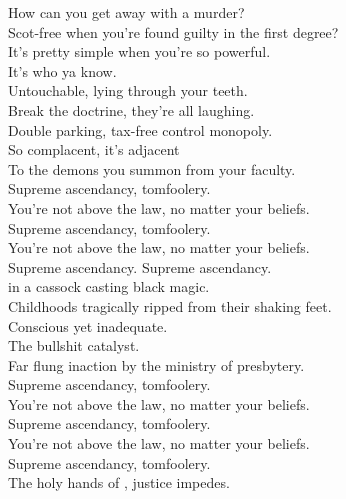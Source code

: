 



How can you get away with a murder? \\
Scot-free when you're found guilty in the first degree? \\
It's pretty simple when you're so powerful. \\
It's who ya know. \\

Untouchable, lying through your teeth. \\
Break the doctrine, they're all laughing. \\
Double parking, tax-free control monopoly. \\
So complacent, it's adjacent \\
To the demons you summon from your faculty. \\

Supreme ascendancy, tomfoolery. \\
You're not above the law, no matter your beliefs. \\
Supreme ascendancy, tomfoolery. \\
You're not above the law, no matter your beliefs. \\

Supreme ascendancy. Supreme ascendancy. \\

 in a cassock casting black magic. \\
Childhoods tragically ripped from their shaking feet. \\
Conscious yet inadequate. \\
The bullshit catalyst. \\
Far flung inaction by the ministry of presbytery. \\

Supreme ascendancy, tomfoolery. \\
You're not above the law, no matter your beliefs. \\
Supreme ascendancy, tomfoolery. \\
You're not above the law, no matter your beliefs. \\
Supreme ascendancy, tomfoolery. \\
The holy hands of , justice impedes. \\

